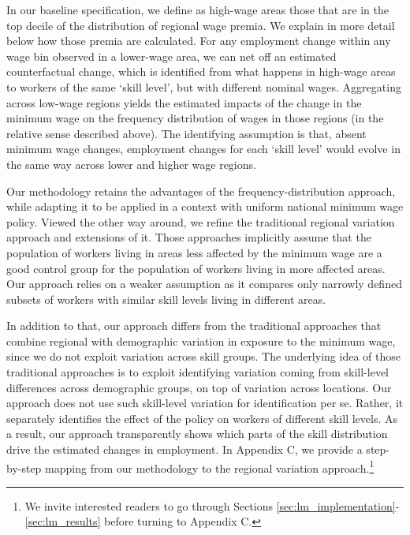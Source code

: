 In our baseline specification, we define as high-wage areas those that are in the top decile of the distribution of regional wage premia. We explain in more detail below how those premia are calculated. For any employment change within any wage bin observed in a lower-wage area, we can net off an estimated counterfactual change, which is identified from what happens in high-wage areas to workers of the same `skill level’, but with different nominal wages. Aggregating across low-wage regions yields the estimated impacts of the change in the minimum wage on the frequency distribution of wages in those regions (in the relative sense described above). The identifying assumption is that, absent minimum wage changes, employment changes for each `skill level’ would evolve in the same way across lower and higher wage regions.  \par

Our methodology retains the advantages of the frequency-distribution approach, while adapting it to be applied in a context with uniform national minimum wage policy. Viewed the other way around, we refine the traditional regional variation approach and extensions of it. Those approaches implicitly assume that the population of workers living in areas less affected by the minimum wage are a good control group for the population of workers living in more affected areas. Our approach relies on a weaker assumption as it compares only narrowly defined subsets of workers with similar skill levels living in different areas. 

In addition to that, our approach differs from the traditional approaches that combine regional with demographic variation in exposure to the minimum wage, since we do not exploit variation across skill groups. The underlying idea of those traditional approaches is to exploit identifying variation coming from skill-level differences across demographic groups, on top of variation across locations. Our approach does not use such skill-level variation for identification per se. Rather, it separately identifies the effect of the policy on workers of different skill levels. As a result, our approach transparently shows which parts of the skill distribution drive the estimated changes in employment. In Appendix C, we provide a step-by-step mapping from our methodology to the regional variation approach.\footnote{We invite interested readers to go through Sections \ref{sec:lm_implementation}-\ref{sec:lm_results} before turning to Appendix C.} \par





